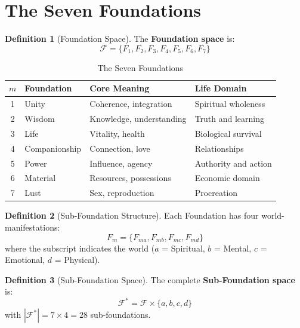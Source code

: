 \documentclass[11pt,twoside,openright]{book}
\theoremstyle{definition}
\newtheorem{definition}{Definition}[chapter]
\theoremstyle{plain}
\theoremstyle{remark}
\newcommand{\Foundations}{\mathcal{F}}
\begin{document}
\section{The Seven Foundations}

\begin{definition}[Foundation Space]
\label{def:foundation-space}
The \textbf{Foundation space} is:
\[
\Foundations = \{F_1, F_2, F_3, F_4, F_5, F_6, F_7\}
\]
\end{definition}

\begin{table}[h]
\centering
\caption{The Seven Foundations}
\label{tab:foundations}
\begin{tabular}{clll}
\toprule
$m$ & \textbf{Foundation} & \textbf{Core Meaning} & \textbf{Life Domain} \\
\midrule
1 & Unity & Coherence, integration & Spiritual wholeness \\
2 & Wisdom & Knowledge, understanding & Truth and learning \\
3 & Life & Vitality, health & Biological survival \\
4 & Companionship & Connection, love & Relationships \\
5 & Power & Influence, agency & Authority and action \\
6 & Material & Resources, possessions & Economic domain \\
7 & Lust & Sex, reproduction & Procreation \\
\bottomrule
\end{tabular}
\end{table}

\begin{definition}[Sub-Foundation Structure]
\label{def:subfoundation}
Each Foundation has four world-manifestations:
\[
F_m = \{F_{ma}, F_{mb}, F_{mc}, F_{md}\}
\]
where the subscript indicates the world ($a$ = Spiritual, $b$ = Mental, $c$ = Emotional, $d$ = Physical).
\end{definition}

\begin{definition}[Sub-Foundation Space]
\label{def:subfoundation-space}
The complete \textbf{Sub-Foundation space} is:
\[
\Foundations^* = \Foundations \times \{a, b, c, d\}
\]
with $|\Foundations^*| = 7 \times 4 = 28$ sub-foundations.
\end{definition}
\end{document}
